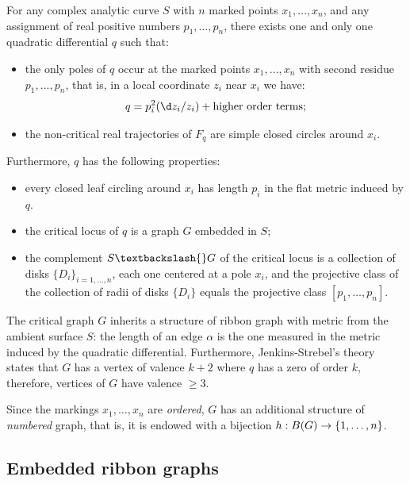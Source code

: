 \begin{theorem} For any complex
  analytic curve $S$ with $n$ marked points $x_1, \ldots, x_n$, and any
  assignment of real positive numbers $p_1, \ldots, p_n$, there exists one
  and only one quadratic differential $q$ such that:
  \begin{itemize}
  \item the only poles of $q$ occur at the marked points $x_1, \ldots, x_n$
    with second residue $p_1, ..., p_n$, that is, in a local
    coordinate $z_i$ near $x_i$ we have:
    \begin{equation*}
      q = p_i^2 (\d z_i / z_i) + \text{higher order terms};
    \end{equation*}
  \item the non-critical real trajectories of $F_q$ are simple closed
    circles around $x_i$.
  \end{itemize}
  Furthermore, $q$ has the following properties:
  \begin{itemize}
  \item every closed leaf circling around $x_i$ has length $p_i$ in the flat
    metric induced by $q$.
  \item the critical locus of $q$ is a graph $G$ embedded in $S$;
  \item the complement $S \textbackslash{} G$ of the critical locus is a collection
    of disks $\{D_i\}_{i=1,\ldots,n}$, each one centered at a pole $x_i$, and
    the projective class of the collection of radii of disks $\{D_i\}$
    equals the projective class $[p_1, \ldots, p_n]$.
  \end{itemize}
\end{theorem}
The critical graph $G$ inherits a structure of ribbon graph with
metric from the ambient surface $S$: the length of an edge $\alpha$ is the
one measured in the metric induced by the quadratic
differential. Furthermore, Jenkins-Strebel's theory states that $G$ has a
vertex of valence $k+2$ where $q$ has a zero of order $k$, therefore,
vertices of $G$ have valence $\geq3$.

Since the markings $x_1, \ldots, x_n$ are \emph{ordered}, $G$ has an
additional structure of \emph{numbered} graph, that is, it is endowed
with a bijection $h: B(G) \to \{1, \ldots, n\}$. 


\subsection{Embedded ribbon graphs}
\label{sec:embedded-rg}




